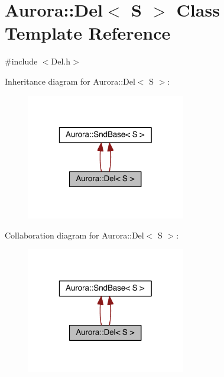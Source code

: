 \hypertarget{class_aurora_1_1_del}{}\section{Aurora\+:\+:Del$<$ S $>$ Class Template Reference}
\label{class_aurora_1_1_del}


{\ttfamily \#include $<$Del.\+h$>$}



Inheritance diagram for Aurora\+:\+:Del$<$ S $>$\+:
\nopagebreak
\begin{figure}[H]
\begin{center}
\leavevmode
\includegraphics[width=196pt]{class_aurora_1_1_del__inherit__graph}
\end{center}
\end{figure}


Collaboration diagram for Aurora\+:\+:Del$<$ S $>$\+:
\nopagebreak
\begin{figure}[H]
\begin{center}
\leavevmode
\includegraphics[width=196pt]{class_aurora_1_1_del__coll__graph}
\end{center}
\end{figure}
